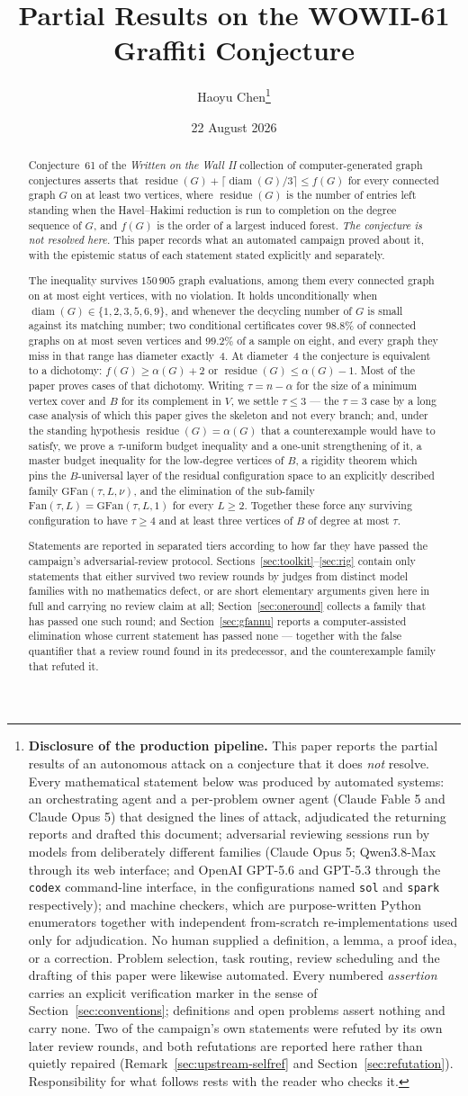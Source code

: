 \documentclass[11pt]{article}
\title{Partial Results on the WOWII-61 Graffiti Conjecture}
\author{Haoyu Chen\thanks{%
\textbf{Disclosure of the production pipeline.}
This paper reports the partial results of an autonomous attack on a conjecture that it
does \emph{not} resolve. Every mathematical statement below was produced by automated
systems: an orchestrating agent and a per-problem owner agent (Claude Fable 5 and Claude
Opus 5) that designed the lines of attack, adjudicated the returning reports and drafted
this document; adversarial reviewing sessions run by models from deliberately different
families (Claude Opus 5; Qwen3.8-Max through its web interface; and OpenAI GPT-5.6 and
GPT-5.3 through the \texttt{codex} command-line interface, in the configurations named
\texttt{sol} and \texttt{spark} respectively); and machine checkers, which are
purpose-written Python enumerators together with independent from-scratch
re-implementations used only for adjudication. No human supplied a definition, a lemma, a
proof idea, or a correction. Problem selection, task routing, review scheduling and the
drafting of this paper were likewise automated.
Every numbered \emph{assertion} carries an explicit verification marker in the sense of
Section~\ref{sec:conventions}; definitions and open problems assert nothing and carry
none. Two of the campaign's own statements were refuted by its own later review rounds,
and both refutations are reported here rather than quietly repaired
(Remark~\ref{sec:upstream-selfref} and Section~\ref{sec:refutation}).
Responsibility for what follows rests with the reader who checks it.}}
\date{22 August 2026}
\theoremstyle{plain}
\theoremstyle{definition}
\theoremstyle{remark}
\numberwithin{equation}{section}
\DeclareMathOperator{\res}{residue}
\DeclareMathOperator{\diam}{diam}
\newcommand{\Fan}{\mathrm{Fan}}
\newcommand{\GFan}{\mathrm{GFan}}
\begin{document}
\maketitle

\begin{abstract}
Conjecture~61 of the \emph{Written on the Wall II} collection of computer-generated graph
conjectures asserts that
$\res(G) + \lceil \diam(G)/3 \rceil \le f(G)$
for every connected graph $G$ on at least two vertices, where $\res(G)$ is the number of
entries left standing when the Havel--Hakimi reduction is run to completion on the degree
sequence of $G$, and $f(G)$ is the order of a largest induced forest. \emph{The conjecture
is not resolved here.} This paper records what an automated campaign proved about it,
with the epistemic status of each statement stated explicitly and separately.

The inequality survives $150\,905$ graph evaluations, among them every connected graph on
at most eight vertices, with no violation. It holds unconditionally when
$\diam(G) \in \{1,2,3,5,6,9\}$, and whenever the decycling number of $G$ is small against
its matching number; two conditional certificates cover $98.8\%$ of connected graphs on at
most seven vertices and $99.2\%$ of a sample on eight, and every graph they miss in that
range has diameter exactly~$4$. At diameter~$4$ the conjecture is equivalent to a
dichotomy: $f(G) \ge \alpha(G)+2$ or $\res(G) \le \alpha(G)-1$. Most of the paper proves
cases of that dichotomy. Writing $\tau = n - \alpha$ for the size of a minimum vertex
cover and $B$ for its complement in $V$, we settle $\tau \le 3$ --- the $\tau = 3$ case by
a long case analysis of which this paper gives the skeleton and not every branch; and, under
the
standing hypothesis $\res(G) = \alpha(G)$ that a counterexample would have to satisfy, we
prove a $\tau$-uniform budget inequality and a one-unit strengthening of it, a master
budget inequality for the low-degree vertices of $B$, a rigidity theorem which pins the
$B$-universal layer of the residual configuration space to an explicitly described family
$\GFan(\tau,L,\nu)$, and the elimination of the sub-family $\Fan(\tau,L) = \GFan(\tau,L,1)$
for every $L \ge 2$. Together these force any surviving configuration to have $\tau \ge 4$
and at least three vertices of $B$ of degree at most $\tau$.

Statements are reported in separated tiers according to how far they have passed the
campaign's adversarial-review protocol. Sections~\ref{sec:toolkit}--\ref{sec:rig} contain
only statements that either survived two review rounds by judges from distinct model
families with no mathematics defect, or are short elementary arguments given here in full
and carrying no review claim at all; Section~\ref{sec:oneround} collects a family that has
passed one such round; and Section~\ref{sec:gfannu} reports a computer-assisted elimination whose current
statement has passed none --- together with the false quantifier that a review round found
in its predecessor, and the counterexample family that refuted it.
\end{abstract}
\end{document}
